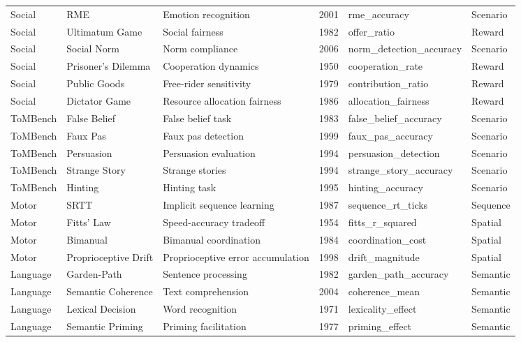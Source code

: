 \documentclass[10pt,landscape]{article}
\begin{document}
\begin{longtable}{@{}p{2.3cm}p{3.0cm}p{4.5cm}p{0.6cm}p{3.8cm}p{1.8cm}@{}}
\midrule
Social & RME & Emotion recognition \citep{baroncohen2001eyes} & 2001 & rme\_accuracy & Scenario \\
Social & Ultimatum Game & Social fairness \citep{guth1982experimental} & 1982 & offer\_ratio & Reward \\
Social & Social Norm & Norm compliance & 2006 & norm\_detection\_accuracy & Scenario \\
Social & Prisoner's Dilemma & Cooperation dynamics & 1950 & cooperation\_rate & Reward \\
Social & Public Goods & Free-rider sensitivity & 1979 & contribution\_ratio & Reward \\
Social & Dictator Game & Resource allocation fairness & 1986 & allocation\_fairness & Reward \\

\midrule
ToMBench & False Belief & False belief task \citep{baroncohen1985mindblindness} & 1983 & false\_belief\_accuracy & Scenario \\
ToMBench & Faux Pas & Faux pas detection \citep{stone1998faux} & 1999 & faux\_pas\_accuracy & Scenario \\
ToMBench & Persuasion & Persuasion evaluation & 1994 & persuasion\_detection & Scenario \\
ToMBench & Strange Story & Strange stories \citep{happe1994advanced} & 1994 & strange\_story\_accuracy & Scenario \\
ToMBench & Hinting & Hinting task \citep{corcoran1995schizophrenia} & 1995 & hinting\_accuracy & Scenario \\

\midrule
Motor & SRTT & Implicit sequence learning \citep{nissen1987attentional} & 1987 & sequence\_rt\_ticks & Sequence \\
Motor & Fitts' Law & Speed-accuracy tradeoff \citep{fitts1954information} & 1954 & fitts\_r\_squared & Spatial \\
Motor & Bimanual & Bimanual coordination & 1984 & coordination\_cost & Spatial \\
Motor & Proprioceptive Drift & Proprioceptive error accumulation & 1998 & drift\_magnitude & Spatial \\

\midrule
Language & Garden-Path & Sentence processing \citep{ferreira2002good} & 1982 & garden\_path\_accuracy & Semantic \\
Language & Semantic Coherence & Text comprehension & 2004 & coherence\_mean & Semantic \\
Language & Lexical Decision & Word recognition & 1971 & lexicality\_effect & Semantic \\
Language & Semantic Priming & Priming facilitation & 1977 & priming\_effect & Semantic \\


\end{longtable}
\end{document}
